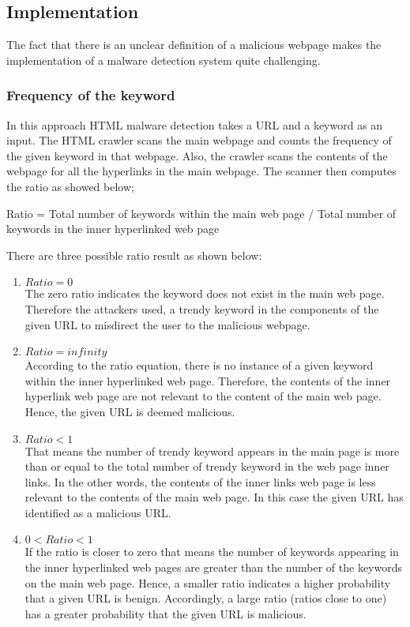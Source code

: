 
\subsection{Implementation}
The fact that there is an unclear definition of a malicious webpage makes the implementation of a malware detection system quite challenging. 	  
	

\subsubsection{Frequency of the keyword}
 
In this approach HTML malware detection takes a URL and a keyword as an input. The HTML crawler scans the main webpage and counts the frequency of the given keyword in that webpage. Also, the crawler scans the contents of the webpage for all the hyperlinks in the main webpage. The scanner then computes the ratio as showed below;

Ratio = Total number of keywords within the main web page / Total number of keywords in the inner hyperlinked web page 

There are three possible ratio result as shown below:
\begin{enumerate}
\item 
$Ratio = 0$\\
The zero ratio indicates the keyword does not exist in the main web page. Therefore the attackers used, a trendy keyword in the components of the given URL to misdirect the user to the malicious webpage. 
\item
$Ratio = infinity$\\
According to the ratio equation, there is no instance of a given keyword within the inner hyperlinked web page. Therefore, the contents of the inner hyperlink web page are not relevant to the content of the main web page. Hence, the given URL is deemed malicious.
\item
$Ratio < 1$\\
That means the number of trendy keyword appears in the main page is more than or equal to the total number of trendy keyword in the web page inner links. In the other words, the contents of the inner links web page is less relevant to the contents of the main web page. In this case the given URL has identified as a malicious URL. 
\item
$0 < Ratio < 1$\\
If the ratio is closer to zero that means the number of keywords appearing in the inner hyperlinked web pages are greater than the number of the keywords on the main web page. Hence, a smaller ratio indicates a higher probability that a given URL is benign. Accordingly, a large ratio (ratios close to one) has a greater probability that the given URL is malicious.
\end{enumerate}
